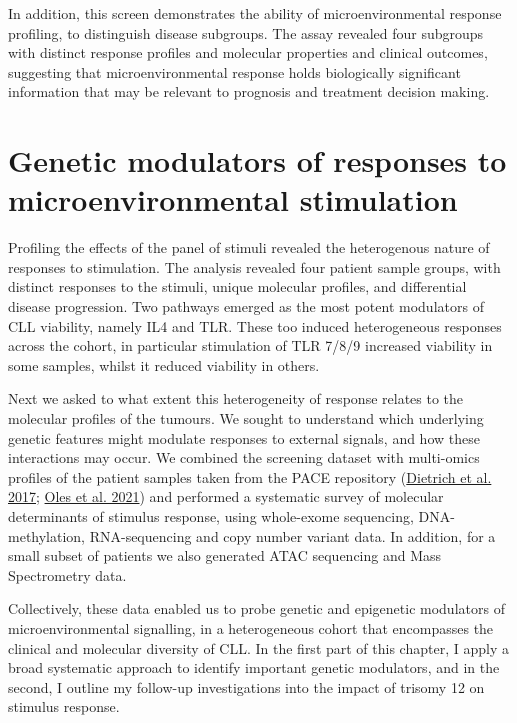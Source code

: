 \documentclass[11pt, a4paper, twosided]{book}
\begin{document}
In addition, this screen demonstrates the ability of microenvironmental response profiling, to distinguish disease subgroups. The assay revealed four subgroups with distinct response profiles and molecular properties and clinical outcomes, suggesting that microenvironmental response holds biologically significant information that may be relevant to prognosis and treatment decision making.

\hypertarget{chapter5}{%
\chapter{Genetic modulators of responses to microenvironmental stimulation}\label{chapter5}}

Profiling the effects of the panel of stimuli revealed the heterogenous nature of responses to stimulation. The analysis revealed four patient sample groups, with distinct responses to the stimuli, unique molecular profiles, and differential disease progression. Two pathways emerged as the most potent modulators of CLL viability, namely IL4 and TLR. These too induced heterogeneous responses across the cohort, in particular stimulation of TLR 7/8/9 increased viability in some samples, whilst it reduced viability in others.

Next we asked to what extent this heterogeneity of response relates to the molecular profiles of the tumours. We sought to understand which underlying genetic features might modulate responses to external signals, and how these interactions may occur. We combined the screening dataset with multi-omics profiles of the patient samples taken from the PACE repository (\protect\hyperlink{ref-JCIpaper}{Dietrich et al. 2017}; \protect\hyperlink{ref-R-BloodCancerMultiOmics2017}{Oles et al. 2021}) and performed a systematic survey of molecular determinants of stimulus response, using whole-exome sequencing, DNA-methylation, RNA-sequencing and copy number variant data. In addition, for a small subset of patients we also generated ATAC sequencing and Mass Spectrometry data.

Collectively, these data enabled us to probe genetic and epigenetic modulators of microenvironmental signalling, in a heterogeneous cohort that encompasses the clinical and molecular diversity of CLL. In the first part of this chapter, I apply a broad systematic approach to identify important genetic modulators, and in the second, I outline my follow-up investigations into the impact of trisomy 12 on stimulus response.
\end{document}

